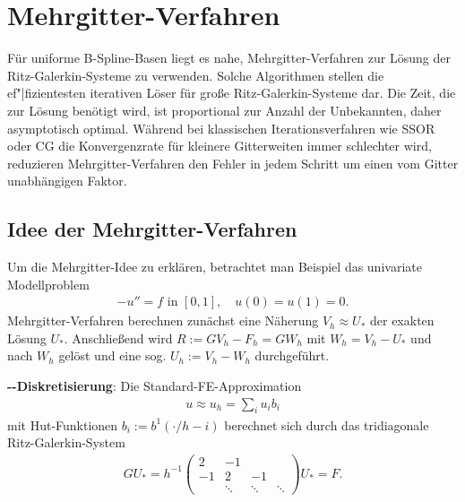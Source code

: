 \chapter{%
    Mehrgitter-Verfahren%
}

Für uniforme B-Spline-Basen liegt es nahe, Mehrgitter-Verfahren zur Lösung der
Ritz-Galerkin-Systeme zu verwenden.
Solche Algorithmen stellen die ef"|fizientesten iterativen Löser für große
Ritz-Galerkin-Systeme dar.
Die Zeit, die zur Lösung benötigt wird, ist proportional zur Anzahl der Unbekannten,
daher asymptotisch optimal.
Während bei klassischen Iterationsverfahren wie SSOR oder CG die Konvergenzrate
für kleinere Gitterweiten immer schlechter wird,
reduzieren Mehrgitter-Verfahren den Fehler in jedem Schritt um einen vom Gitter unabhängigen
Faktor.

\section{%
    Idee der Mehrgitter-Verfahren%
}

Um die Mehrgitter-Idee zu erklären, betrachtet man Beispiel das univariate Modellproblem
\begin{align*}
    -u'' = f \text{ in } [0, 1],\quad
    u(0) = u(1) = 0.
\end{align*}
Mehrgitter-Verfahren berechnen zunächst eine Näherung $V_h \approx U_\ast$ der exakten Lösung
$U_\ast$.
Anschließend wird $R := GV_h - F_h = GW_h$ mit $W_h = V_h - U_\ast$ und  nach $W_h$ gelöst
und eine sog.  $U_h := V_h - W_h$ durchgeführt.

\linie

\textbf{--Diskretisierung}:
Die Standard-FE-Approximation
\begin{align*}
    u \approx u_h = \sum_i u_i b_i
\end{align*}
mit Hut-Funktionen $b_i := b^1(\cdot/h - i)$ berechnet sich durch das tridiagonale
Ritz-Galerkin-System
\begin{align*}
    GU_\ast = h^{-1} \begin{pmatrix}2 & -1 & &\\-1 & 2 & -1 & \\ & \ddots & \ddots & \ddots
    \end{pmatrix} U_\ast = F.
\end{align*}

\linie

